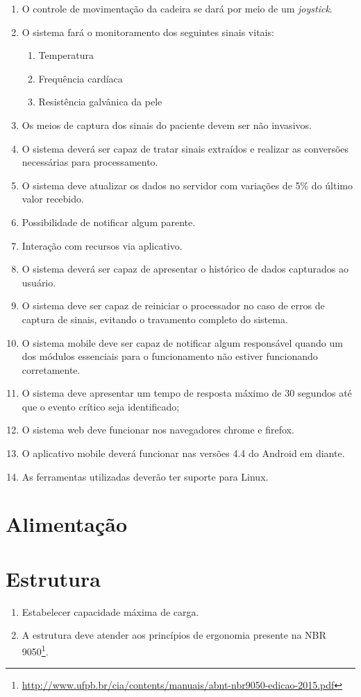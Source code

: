 \begin{enumerate}[resume*]
  \item O controle de movimentação da cadeira se dará por meio de um \textit{joystick}.
  \item O sistema fará o monitoramento dos seguintes sinais vitais:
    \begin{enumerate}[resume*]
      \item Temperatura
      \item Frequência cardíaca
      \item Resistência galvânica da pele
    \end{enumerate}
  \item Os meios de captura dos sinais do paciente devem ser não invasivos.
  \item O sistema deverá ser capaz de tratar sinais extraídos e realizar as
    conversões necessárias para processamento.
  \item O sistema deve atualizar os dados no servidor com variações de 5\% do
    último valor recebido.
  \item Possibilidade de notificar algum parente.
  \item Interação com recursos via aplicativo.
  \item O sistema deverá ser capaz de apresentar o histórico de dados
    capturados ao usuário.
  \item O sistema deve ser capaz de reiniciar o processador no caso de erros de
    captura de sinais, evitando o travamento completo do sistema.
  \item O sistema mobile deve ser capaz de notificar algum responsável quando
    um dos módulos essenciais para o funcionamento não estiver funcionando corretamente.
  \item O sistema deve apresentar um tempo de resposta máximo de 30 segundos
    até que o evento crítico seja identificado;
  \item O sistema web deve funcionar nos navegadores chrome e firefox.
  \item O aplicativo mobile deverá funcionar nas versões 4.4 do Android em diante.
  \item As ferramentas utilizadas deverão ter suporte para Linux.
\end{enumerate}

\section{Alimentação}

\section{Estrutura}

\begin{enumerate}[resume*]
  \item Estabelecer capacidade máxima de carga.
  \item A estrutura deve atender aos princípios de ergonomia presente na NBR 9050\footnote{\url{http://www.ufpb.br/cia/contents/manuais/abnt-nbr9050-edicao-2015.pdf}}.
\end{enumerate}

